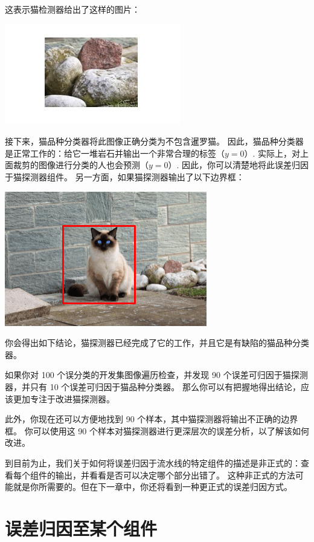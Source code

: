 这表示猫检测器给出了这样的图片：

\includegraphics{./img/ch53_04.jpeg}

接下来，猫品种分类器将此图像正确分类为不包含暹罗猫。
因此，猫品种分类器是正常工作的：给它一堆岩石并输出一个非常合理的标签（\(y=0\)）.
实际上，对上面裁剪的图像进行分类的人也会预测（\(y=0\)）.
因此，你可以清楚地将此误差归因于猫探测器组件。
另一方面，如果猫探测器输出了以下边界框：

\includegraphics{./img/ch53_03.png}

你会得出如下结论，猫探测器已经完成了它的工作，并且它是有缺陷的猫品种分类器。

如果你对 100 个误分类的开发集图像遍历检查，并发现 90
个误差可归因于猫探测器，并只有 10 个误差可归因于猫品种分类器。
那么你可以有把握地得出结论，应该更加专注于改进猫探测器。

此外，你现在还可以方便地找到 90
个样本，其中猫探测器将输出不正确的边界框。 你可以使用这 90
个样本对猫探测器进行更深层次的误差分析，以了解该如何改进。

到目前为止，我们关于如何将误差归因于流水线的特定组件的描述是非正式的：查看每个组件的输出，并看看是否可以决定哪个部分出错了。
这种非正式的方法可能就是你所需要的。但在下一章中，你还将看到一种更正式的误差归因方式。

\hypertarget{ux8befux5deeux5f52ux56e0ux81f3ux67d0ux4e2aux7ec4ux4ef6}{%
\chapter{误差归因至某个组件}\label{ux8befux5deeux5f52ux56e0ux81f3ux67d0ux4e2aux7ec4ux4ef6}}

